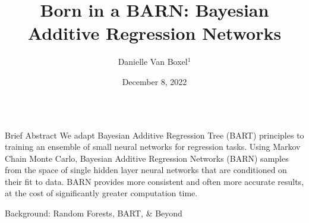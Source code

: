 \documentclass{beamer}
\title{\huge Born in a BARN: Bayesian Additive Regression Networks}
\author{Danielle Van Boxel$^{1}$}
\institute[UA:AM]{$^{1}$University of Arizona, Applied Math Program \\ \hphantom{1cm}}
\date{December 8, 2022}
\newlength{\columnheight}
\begin{document}
\begin{frame}
\begin{columns}
	\begin{column}{.33\textwidth}
		\begin{minipage}{.98\textwidth}  %
		\parbox[t][\columnheight]{\textwidth}{ %
		\begin{myblock}{Brief Abstract}
We adapt Bayesian Additive Regression Tree (BART)\cite{chipman2010bart} principles to training an ensemble of small neural networks\cite{schmidhuber2015deep} for regression tasks.  Using Markov Chain Monte Carlo\cite{hastings1970monte}, Bayesian Additive Regression Networks (BARN) samples from the space of single hidden layer neural networks that are conditioned on their fit to data.  BARN provides more consistent and often more accurate results, at the cost of significantly greater computation time.
		\end{myblock}
		\begin{myblock}{Background: Random Forests, BART, \& Beyond}
             \\ \vspace{-2em}
\begin{figure}[h]

\end{figure}
\end{myblock}}
\end{minipage}
\end{column}
\end{columns}
\end{frame}
\end{document}
